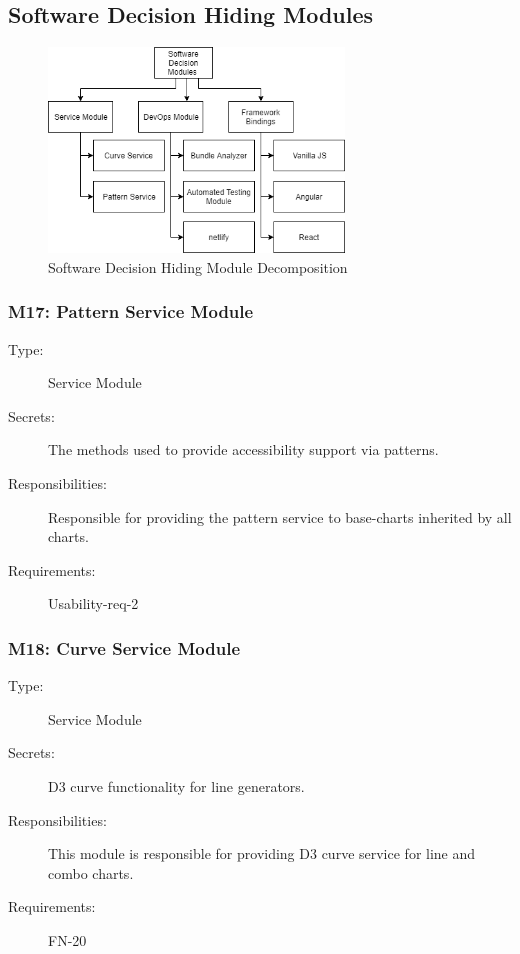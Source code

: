 \documentclass[12pt, titlepage]{article}
\begin{document}
\subsection{Software Decision Hiding Modules}
\begin{figure}[H]
\centering
\includegraphics[width=0.7\textwidth]{software-decision-decomp.png}
\caption{Software Decision Hiding Module Decomposition}
\label{FigUH}
\end{figure}

\subsubsection{M17: Pattern Service Module}
\begin{description}
\item[Type:] Service Module
\item[Secrets:] The methods used to provide accessibility support via patterns.     
\item[Responsibilities:] Responsible for providing the pattern service to base-charts inherited by all charts. 
\item[Requirements:] Usability-req-2
\end{description}


\subsubsection{M18: Curve Service Module}
\begin{description}
\item[Type:] Service Module
\item[Secrets:] D3 curve functionality for line generators. 
\item[Responsibilities:] This module is responsible for providing D3 curve service for line and combo charts.
\item[Requirements:] FN-20
\end{description}
\end{document}
